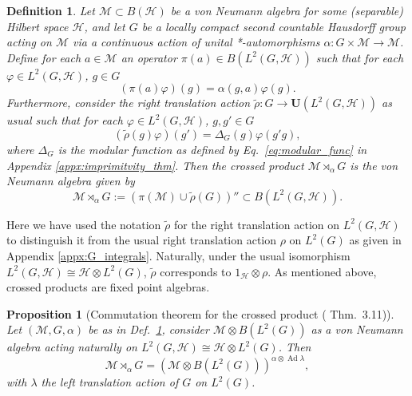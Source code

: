 \documentclass[sn-mathphys-num]{sn-jnl}%
\newcommand{\HH}{\mathcal{H}}
\newcommand{\MM}{\mathcal{M}}
\DeclareMathOperator{\Ad}{Ad}
\numberwithin{equation}{section}
\theoremstyle{thmstyleone}%
\newtheorem{proposition}[theorem]{Proposition}%
\theoremstyle{thmstyletwo}%
\theoremstyle{thmstylethree}%
\newtheorem{definition}[theorem]{Definition}%
\begin{document}
    \begin{definition}
        \label{def:crossed_prod}
        Let $\MM\subset B(\HH)$ be a von Neumann algebra for some (separable) Hilbert space $\HH$, and let $G$ be a locally compact second countable Hausdorff group acting on $\MM$ via a continuous action of unital *-automorphisms $\alpha:G\times\MM\to \MM$. Define for each $a\in \MM$ an operator $\pi(a)\in B(L^2(G,\HH))$ such that for each $\varphi\in L^2(G,\HH)$, $g\in G$
        \begin{equation}
        \label{eq:pi_map}
            (\pi(a)\varphi)(g)=\alpha(g,a)\varphi(g).
        \end{equation}
        Furthermore, consider the right translation action $\tilde{\rho}:G\to \textbf{U}(L^2(G,\HH))$ as usual such that for each $\varphi\in L^2(G,\HH)$, $g,g'\in G$
        \begin{equation}
            (\tilde{\rho}(g)\varphi)(g')=\Delta_G(g)\varphi(g'g),
        \end{equation}
        where $\Delta_G$ is the modular function as defined by Eq.\ \eqref{eq:modular_func} in Appendix \ref{appx:imprimitvity_thm}. Then the \textup{crossed product} $\MM\rtimes_\alpha G$ is the von Neumann algebra given by
        \begin{equation}
            \MM\rtimes_\alpha G:=(\pi(\MM)\cup\tilde{\rho}(G))''\subset B(L^2(G,\HH)).
        \end{equation}
    \end{definition}
    Here we have used the notation $\tilde{\rho}$ for the right translation action on $L^2(G,\HH)$ to distinguish it from the usual right translation action $\rho$ on $L^2(G)$ as given in Appendix \ref{appx:G_integrals}. Naturally, under the usual isomorphism $L^2(G,\HH)\cong \HH\otimes L^2(G)$, $\tilde{\rho}$ corresponds to $1_\HH\otimes\rho$. As mentioned above, crossed products are fixed point algebras.
    \begin{proposition}[Commutation theorem for the crossed product (\cite{vanDaele:1978} Thm.\ 3.11)]
    \label{prop:comm_thm}
        Let $(\MM,G,\alpha)$ be as in Def.\ \ref{def:crossed_prod}, consider $\MM\otimes B(L^2(G))$ as a von Neumann algebra acting naturally on $L^2(G,\HH)\cong \HH\otimes L^2(G)$. Then
        \begin{equation}
            \MM\rtimes_\alpha G=(\MM\otimes B(L^2(G)))^{\alpha\otimes\Ad\lambda},
        \end{equation}
        with $\lambda$ the left translation action of $G$ on $L^2(G)$.
    \end{proposition}
\end{document}
